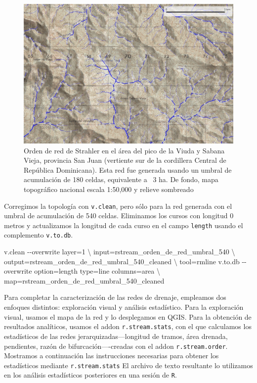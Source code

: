 \documentclass[spanish]{article}
\newenvironment{Shaded}{\begin{snugshade}}{\end{snugshade}}
\newcommand{\AttributeTok}[1]{\textcolor[rgb]{0.77,0.63,0.00}{#1}}
\newcommand{\DataTypeTok}[1]{\textcolor[rgb]{0.13,0.29,0.53}{#1}}
\newcommand{\ExtensionTok}[1]{#1}
\newcommand{\NormalTok}[1]{#1}
\begin{document}
\begin{figure}

{\centering \includegraphics[width=0.8\linewidth]{figuras/red-orden-detalle-mtn} 

}

\caption{Orden de red de Strahler en el área del pico de la Viuda y Sabana Vieja, provincia San Juan (vertiente sur de la cordillera Central de República Dominicana). Esta red fue generada usando un umbral de acumulación de 180 celdas, equivalente a ~3 ha. De fondo, mapa topográfico nacional escala 1:50,000 y relieve sombreado}\label{fig:redordenumbral180}
\end{figure}

Corregimos la topología con \texttt{v.clean}, pero sólo para la red
generada con el umbral de acumulación de 540 celdas. Eliminamos los
cursos con longitud 0 metros y actualizamos la longitud de cada curso en
el campo \texttt{length} usando el complemento \texttt{v.to.db}.

\begin{Shaded}
\begin{Highlighting}[]
\ExtensionTok{v.clean} \AttributeTok{{-}{-}overwrite}\NormalTok{ layer=1 }\DataTypeTok{\textbackslash{}}
\NormalTok{  input=rstream\_orden\_de\_red\_umbral\_540 }\DataTypeTok{\textbackslash{}}
\NormalTok{  output=rstream\_orden\_de\_red\_umbral\_540\_cleaned }\DataTypeTok{\textbackslash{}}
\NormalTok{  tool=rmline}
\ExtensionTok{v.to.db} \AttributeTok{{-}{-}overwrite}\NormalTok{ option=length type=line columns=area }\DataTypeTok{\textbackslash{}}
\NormalTok{  map=rstream\_orden\_de\_red\_umbral\_540\_cleaned}
\end{Highlighting}
\end{Shaded}

Para completar la caracterización de las redes de drenaje, empleamos dos
enfoques distintos: exploración visual y análisis estadístico. Para la
exploración visual, usamos el mapa de la red y lo desplegamos en QGIS.
Para la obtención de resultados analíticos, usamos el addon
\texttt{r.stream.stats}, con el que calculamos los estadísticos de las
redes jerarquizadas---longitud de tramos, área drenada, pendientes,
razón de bifurcación----creadas con el addon \texttt{r.stream.order}.
Mostramos a continuación las instrucciones necesarias para obtener los
estadísticos mediante \texttt{r.stream.stats} El archivo de texto
resultante lo utilizamos en los análisis estadísticos posteriores en una
sesión de \texttt{R}.
\end{document}
